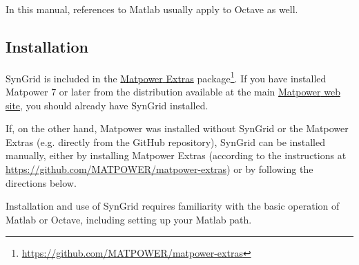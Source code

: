 \documentclass[12pt]{article}
\newcommand{\matlab}[0]{{\sc Matlab}}
\newcommand{\matpower}[0]{{\sc Matpower}}
\newcommand{\matpowerurl}[0]{https://matpower.org}
\newcommand{\matpowerextras}[0]{{\matpower{} Extras}}
\newcommand{\matpowerextrasurl}[0]{https://github.com/MATPOWER/matpower-extras}
\newcommand{\matpowerextraslink}[0]{\href{\matpowerextrasurl}{\matpowerextras{}}}
\newcommand{\syngrid}[0]{{SynGrid}}
\numberwithin{equation}{section}
\numberwithin{table}{section}
\numberwithin{figure}{section}
\begin{document}
In this manual, references to \matlab{} usually apply to Octave as well.

\subsection{Installation}
\label{sec:installation}

\syngrid{} is included in the \matpowerextraslink{} package\footnote{\url{\matpowerextrasurl}}. If you have installed \matpower{} 7 or later from the distribution available at the main \href{\matpowerurl}{\matpower{} web site}, you should already have \syngrid{} installed.

If, on the other hand, \matpower{} was installed without \syngrid{} or the  \matpowerextras{} (e.g. directly from the GitHub repository), \syngrid{} can be installed manually, either by installing \matpowerextras{} (according to the instructions at \url{\matpowerextrasurl}) or by following the directions below.

Installation and use of \syngrid{} requires familiarity with the basic operation of \matlab{} or Octave, including setting up your \matlab{} path.
\end{document}
